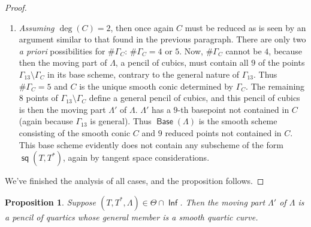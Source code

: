 \documentclass[reqno, 11pt]{amsart}
\theoremstyle{plain}
\newtheorem{proposition}[theorem]{Proposition}
\theoremstyle{remark}
\DeclareMathOperator{\s}{\mathsf{sq}}
\DeclareMathOperator{\Inf}{\mathsf{Inf}}
\DeclareMathOperator{\Base}{\mathsf{Base}}
\begin{document}
\begin{proof}
\begin{enumerate}
  \item \emph{Assuming $\deg (C) = 2$}, then once again $C$ must be reduced as is seen by
  an argument similar to that found in the previous paragraph.  There
  are only two {\sl a priori} possibilities for $\# \Gamma_{C}$:
  $\# \Gamma_{C} = 4$ or $5$. Now, $\# \Gamma_{C}$ cannot be $4$,
  because then the moving part of $\Lambda$, a pencil of cubics, must
  contain all $9$ of the points $\Gamma_{13} \setminus \Gamma_{C}$ in
  its base scheme, contrary to the general nature of $\Gamma_{13}$.
  Thus $\# \Gamma_{C} = 5$ and $C$ is the unique smooth conic
  determined by $\Gamma_{C}$.  The remaining $8$ points of
  $\Gamma_{13} \setminus \Gamma_{C}$ define a general pencil of
  cubics, and this pencil of cubics is then the moving part $\Lambda'$ of $\Lambda$. $\Lambda'$ has
  a $9$-th basepoint not contained in $C$ (again because $\Gamma_{13}$ is
  general). Thus $\Base(\Lambda)$ is the smooth scheme consisting of
  the smooth conic $C$ and $9$ reduced points not contained in $C$. This base
  scheme evidently does not contain any subscheme of the form
  $\s(T,T^{*})$, again by tangent space considerations.
\end{enumerate}
  We've finished the analysis of all cases, and the proposition
  follows.
\end{proof}


\begin{proposition}
    \label{proposition:Movesingular} Suppose $(T,T^{*},\Lambda) \in \Theta \cap \Inf$.  Then the moving part $\Lambda'$ of $\Lambda$ is a pencil of quartics whose general member is a smooth quartic curve.
\end{proposition}
\end{document}
